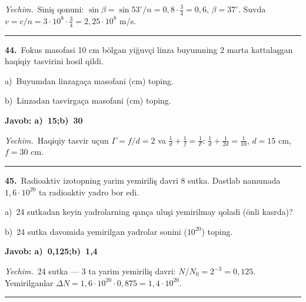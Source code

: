 \documentclass[11pt,a4paper]{article}
\begin{document}
\noindent\textit{Yechim.}\ Siniş qonuni: $\sin\beta=\sin53^\circ/n=0{,}8\cdot\frac34=0{,}6$, $\beta=37^\circ$. Suvda $v=c/n=3\cdot10^8\cdot\frac34=2{,}25\cdot10^8$ m/s.\par\par\medskip\hrule\medskip
{}\noindent\textbf{44.}\ Fokus masofasi 10 cm bölgan yiğuvçi linza buyumning 2 marta kattalaşgan haqiqiy tasvirini hosil qildi.\par
\noindent\hspace*{4mm}a)\ Buyumdan linzagaça masofani (cm) toping.\par
\noindent\hspace*{4mm}b)\ Linzadan tasvirgaça masofani (cm) toping.\par
\noindent\colorbox{gray!12}{\parbox{\dimexpr\linewidth-2\fboxsep}{\textbf{Javob: a)\ 15;\quad b)\ 30}}}\par\smallskip
\noindent\textit{Yechim.}\ Haqiqiy tasvir uçun $\Gamma=f/d=2$ va $\frac1d+\frac1f=\frac1F$: $\frac1d+\frac1{2d}=\frac1{10}$, $d=15$ cm, $f=30$ cm.\par\par\medskip\hrule\medskip
{}\noindent\textbf{45.}\ Radioaktiv izotopning yarim yemiriliş davri 8 sutka. Dastlab namunada $1{,}6\cdot10^{20}$ ta radioaktiv yadro bor edi.\par
\noindent\hspace*{4mm}a)\ 24 sutkadan keyin yadrolarning qança uluşi yemirilmay qoladi (önli kasrda)?\par
\noindent\hspace*{4mm}b)\ 24 sutka davomida yemirilgan yadrolar sonini ($10^{20}$) toping.\par
\noindent\colorbox{gray!12}{\parbox{\dimexpr\linewidth-2\fboxsep}{\textbf{Javob: a)\ 0,125;\quad b)\ 1,4}}}\par\smallskip
\noindent\textit{Yechim.}\ 24 sutka — 3 ta yarim yemiriliş davri: $N/N_0=2^{-3}=0{,}125$. Yemirilganlar $\Delta N=1{,}6\cdot10^{20}\cdot0{,}875=1{,}4\cdot10^{20}$.\par\par\medskip\hrule\medskip
\end{document}
